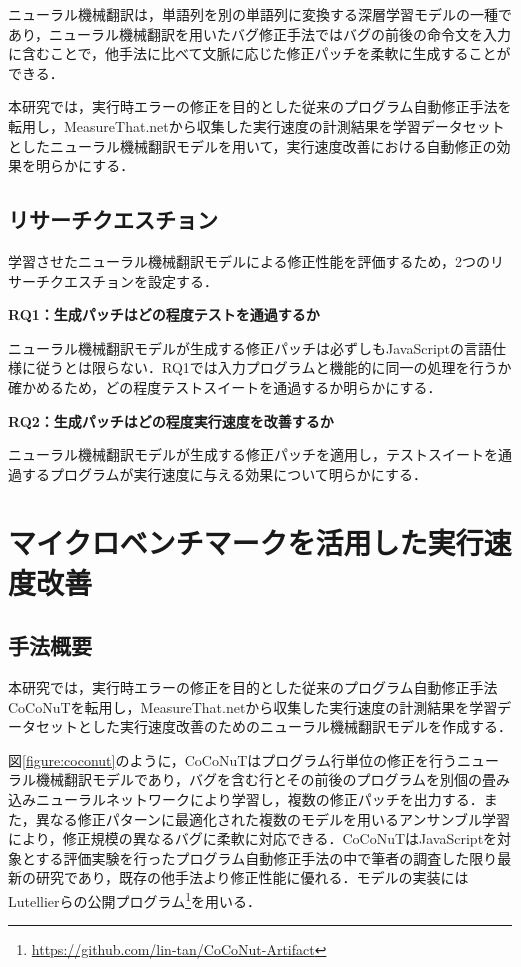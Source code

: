 \documentclass[submit,ses,noauthor]{ipsj}
\begin{document}
ニューラル機械翻訳は，単語列を別の単語列に変換する深層学習モデルの一種であり，ニューラル機械翻訳を用いたバグ修正手法ではバグの前後の命令文を入力に含むことで，他手法に比べて文脈に応じた修正パッチを柔軟に生成することができる．

本研究では，実行時エラーの修正を目的とした従来のプログラム自動修正手法を転用し，MeasureThat.netから収集した実行速度の計測結果を学習データセットとしたニューラル機械翻訳モデルを用いて，実行速度改善における自動修正の効果を明らかにする．



\subsection{リサーチクエスチョン}

学習させたニューラル機械翻訳モデルによる修正性能を評価するため，2つのリサーチクエスチョンを設定する．

\noindent
\textbf{RQ1：生成パッチはどの程度テストを通過するか}

ニューラル機械翻訳モデルが生成する修正パッチは必ずしもJavaScriptの言語仕様に従うとは限らない．RQ1では入力プログラムと機能的に同一の処理を行うか確かめるため，どの程度テストスイートを通過するか明らかにする．

\noindent
\textbf{RQ2：生成パッチはどの程度実行速度を改善するか}

ニューラル機械翻訳モデルが生成する修正パッチを適用し，テストスイートを通過するプログラムが実行速度に与える効果について明らかにする．

\section{マイクロベンチマークを活用した実行速度改善}\label{sec:approach}

\subsection{手法概要}


本研究では，実行時エラーの修正を目的とした従来のプログラム自動修正手法CoCoNuT\cite{lutellier_2020}を転用し，MeasureThat.netから収集した実行速度の計測結果を学習データセットとした実行速度改善のためのニューラル機械翻訳モデルを作成する．

図\ref{figure:coconut}のように，CoCoNuTはプログラム行単位の修正を行うニューラル機械翻訳モデルであり，バグを含む行とその前後のプログラムを別個の畳み込みニューラルネットワークにより学習し，複数の修正パッチを出力する．また，異なる修正パターンに最適化された複数のモデルを用いるアンサンブル学習により，修正規模の異なるバグに柔軟に対応できる．CoCoNuTはJavaScriptを対象とする評価実験を行ったプログラム自動修正手法の中で筆者の調査した限り最新の研究であり，既存の他手法より修正性能に優れる．モデルの実装にはLutellierらの公開プログラム\footnote{\url{https://github.com/lin-tan/CoCoNut-Artifact}}を用いる．
\end{document}
